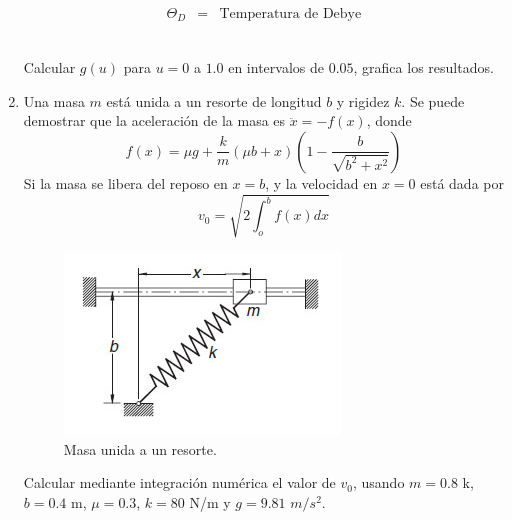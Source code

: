 \documentclass[11pt]{article}
\begin{document}
\begin{enumerate}
\begin{minipage}{4cm}
\begin{eqnarray*}
\Theta_{D} &=& \text{Temperatura de Debye}
\end{eqnarray*}
\end{minipage}
\\
Calcular $g(u)$ para $u=0$ a $1.0$ en intervalos de $0.05$, grafica los resultados.
\item Una masa $m$ est\'{a} unida a un resorte de longitud $b$ y rigidez $k$. Se puede demostrar que la aceleración de la masa es $\ddot{x} = -f(x)$, donde
\[f(x) = \mu g + \dfrac{k}{m} (\mu b + x) \left( 1 - \dfrac{b}{\sqrt{b^{2} + x^{2}}} \right)\]
Si la masa se libera del reposo en $x=b$, y la velocidad en $x=0$ est\'{a} dada por
\[ v_{0} = \sqrt{2 \int_{o}^{b} f(x) dx}\]
\begin{figure}[H]
	\centering
	\includegraphics[scale=0.5]{Imagenes/Integral_02_Resorte.jpg}
	\caption{Masa unida a un resorte.}
\end{figure}
Calcular mediante integración numérica el valor de $v_{0}$, usando $m=0.8$ k, $b=0.4$ m, $\mu=0.3$, $k=80$ N/m y $g=9.81$ $m/s^{2}$.
\end{enumerate}
\end{document}
